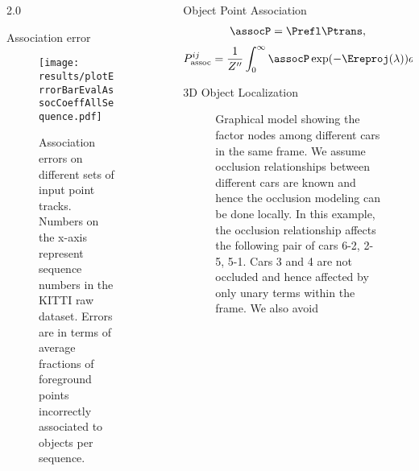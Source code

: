 \documentclass[handout,final]{beamer}
\newlength{\sepwid}
\newlength{\onecolwid}
\begin{document}
\begin{frame}[t]
\begin{columns}[t]
\begin{column}{2.0\onecolwid}
      \begin{block}{Association error}
        \begin{figure}[!!t]
          \centering
          \texttt{[image: results/plotErrorBarEvalAssocCoeffAllSequence.pdf]}
          \vspace{-0.3cm}
          \caption{\small Association errors on different sets of input point tracks. Numbers on the x-axis represent sequence numbers in the KITTI raw dataset. Errors are in terms of average fractions of foreground points incorrectly associated to objects per sequence.}
          \vspace{-0.3cm}
          \label{fig:assoc-occ-results}
        \end{figure}
        \newlength{\tblimgwidth}
        \setlength{\tblimgwidth}{0.080\textwidth}
        
      \end{block}
    \end{column}
    \begin{column}{\sepwid}\end{column}			%
    \begin{column}{\onecolwid}
      \begin{block}{Object Point Association}
        \begin{align}
          \assocP = \Prefl\Ptrans,
          \label{eq:defineassocP}
        \end{align}
        \begin{align}
          P^{ij}_{\text{assoc}} = \frac{1}{Z''}\int_0^{\infty} \assocP \exp(-\Ereproj(\lambda))d\lambda,
          \label{eq:prob-assoc}
        \end{align}
      \end{block}
      \vspace{0.5in}
      \begin{block}{3D Object Localization}
        \begin{figure}
          \centering
          \caption{Graphical model showing the factor nodes among different
            cars in the same frame. We assume occlusion relationships between
            different cars are known and hence the occlusion modeling can be done
            locally. In this example, the occlusion relationship affects the
            following pair of cars 6-2, 2-5, 5-1. Cars 3 and 4 are not occluded
            and hence affected by only unary terms within the frame. We also avoid 
}
\end{figure}
\end{block}
\end{column}
\end{columns}
\end{frame}
\end{document}

